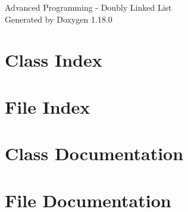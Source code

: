 \documentclass[twoside]{book}
\newcommand{\+}{\discretionary{\mbox{\scriptsize$\hookleftarrow$}}{}{}}
\newcommand{\clearemptydoublepage}{%
    \newpage{\pagestyle{empty}\cleardoublepage}%
  }
\begin{document}
  \raggedbottom
    \hypersetup{pageanchor=false,
                bookmarksnumbered=true,
                pdfencoding=unicode
               }
  \begin{titlepage}
  \vspace*{7cm}
  \begin{center}%
  {\Large Advanced Programming -\/ Doubly Linked List}\\
  \vspace*{1cm}
  {\large Generated by Doxygen 1.18.0}\\
  \end{center}
  \end{titlepage}
  \clearemptydoublepage
  \tableofcontents
  \clearemptydoublepage
  \hypersetup{pageanchor=true}
\chapter{Class Index}

\chapter{File Index}

\chapter{Class Documentation}




\chapter{File Documentation}












  \backmatter
  \newpage
  \clearemptydoublepage
  \printindex
\end{document}
